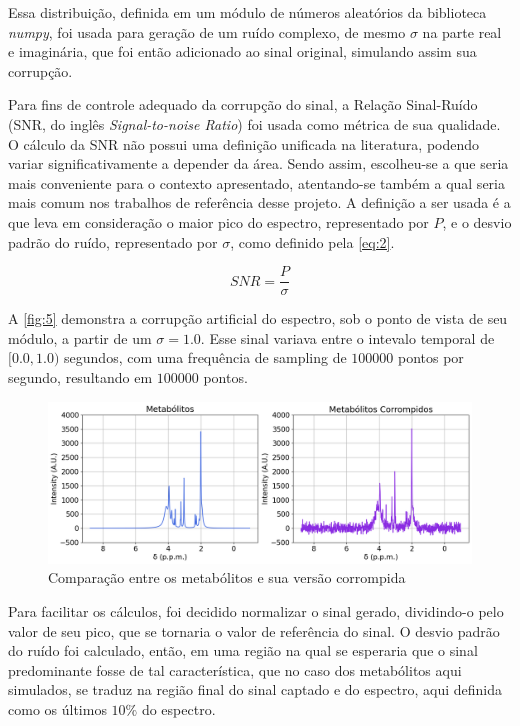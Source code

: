 \documentclass[12pt]{article}
\begin{document}
Essa distribuição, definida em um módulo de números aleatórios da biblioteca \textit{numpy}, foi usada para geração de um ruído complexo, de mesmo $\sigma$ na parte real e imaginária, que foi então adicionado ao sinal original, simulando assim sua
corrupção.

Para fins de controle adequado da corrupção do sinal, a Relação Sinal-Ruído (SNR, do inglês \textit{Signal-to-noise Ratio}) foi usada como métrica de sua qualidade. O cálculo da SNR não possui uma definição unificada na literatura, podendo variar significativamente a depender da área. Sendo assim, 
escolheu-se a que seria mais conveniente para o contexto apresentado, atentando-se também a qual seria mais comum nos trabalhos de referência desse projeto. A definição a ser usada é a que 
leva em consideração o maior pico do espectro, representado por $P$, e o desvio padrão do ruído, representado por $\sigma$, como definido pela \autoref{eq:2}.  

\begin{equation} \label{eq:2}
    SNR = \frac{P}{\sigma}
\end{equation}

A \autoref{fig:5} demonstra a corrupção artificial do espectro, sob o ponto de vista de seu módulo, a partir de um $\sigma = 1.0$. Esse sinal variava 
entre o intevalo temporal de $[0.0, 1.0)$ segundos, com uma frequência de sampling de $100000$ pontos por segundo, resultando em $100000$ pontos.

\begin{figure} [H]
    \includegraphics[scale=0.37]{metabolitos-corrompidos.png}
    \centering
    \caption{Comparação entre os metabólitos e sua versão corrompida}
    \label{fig:5}
\end{figure}

Para facilitar os cálculos, foi decidido normalizar o sinal gerado, dividindo-o pelo valor de seu pico, que se tornaria o valor de referência do sinal. O desvio padrão do ruído foi 
calculado, então, em uma região na qual se esperaria que o sinal predominante fosse de tal característica, que no caso dos metabólitos aqui simulados, se traduz na região final do sinal captado e do espectro, 
aqui definida como os últimos $10\%$ do espectro. 
\end{document}
